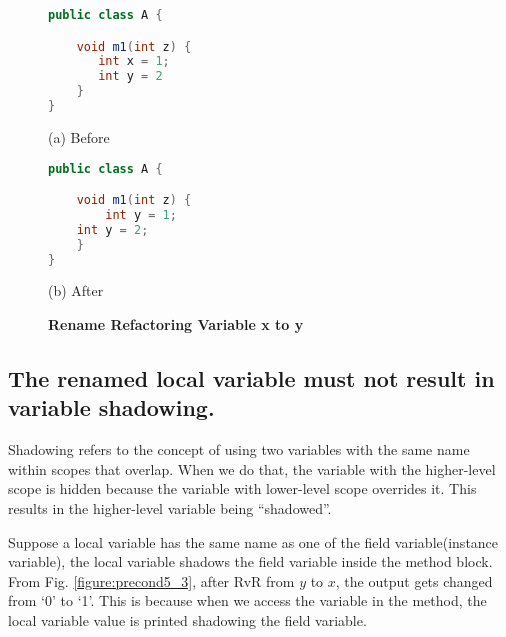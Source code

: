 \begin{figure}[th]
\centering
\begin{minipage}[t]{0.4\linewidth}
\begin{lstlisting}[language=java, basicstyle=\scriptsize\ttfamily,frame=single]
public class A {

    void m1(int z) {
       int x = 1; 
       int y = 2
    }
}
\end{lstlisting}
\centering(a) Before 
\end{minipage}
\hfill
\begin{minipage}[t]{0.4\linewidth}
\begin{lstlisting}[language=java, basicstyle=\scriptsize\ttfamily,frame=single]
public class A {

    void m1(int z) {
        int y = 1; 
	int y = 2;
    }
}
\end{lstlisting}
\centering(b) After 
\end{minipage}
\caption{\textbf{Rename Refactoring Variable x to y}}
\label{figure:precond5_2}
\end{figure}

\subsection{The renamed local variable must not result in variable shadowing.}
Shadowing refers to the concept of using two variables with the same name within scopes that overlap. When we do that, the variable with the higher-level scope is hidden because the variable with lower-level scope overrides it. This results in the higher-level variable being ``shadowed''. 


Suppose a local variable has the same name as one of the field variable(instance variable), the local variable shadows the field variable inside the method block. From Fig. \ref{figure:precond5_3}, after RvR from $y$ to $x$, the output gets changed from `0' to `1'. This is because when we access the variable in the method, the local variable value is printed shadowing the field variable.

